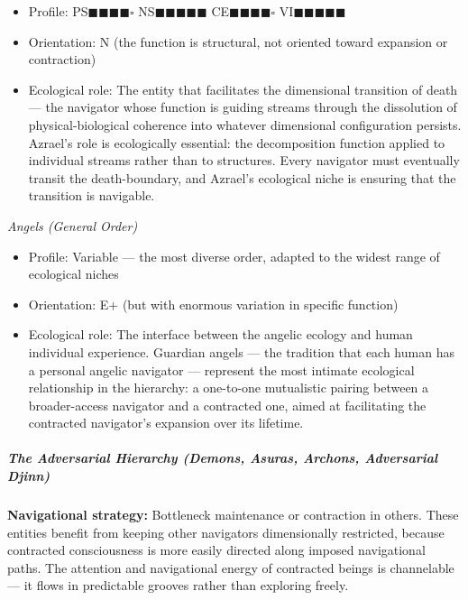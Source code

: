 \begin{itemize}[nosep,leftmargin=*]
  \item Profile: PS$\blacksquare$$\blacksquare$$\blacksquare$$\blacksquare$$\square$ NS$\blacksquare$$\blacksquare$$\blacksquare$$\blacksquare$$\blacksquare$ CE$\blacksquare$$\blacksquare$$\blacksquare$$\blacksquare$$\square$ VI$\blacksquare$$\blacksquare$$\blacksquare$$\blacksquare$$\blacksquare$
  \item Orientation: N (the function is structural, not oriented toward expansion or contraction)
  \item Ecological role: The entity that facilitates the dimensional transition of death — the navigator whose function is guiding streams through the dissolution of physical-biological coherence into whatever dimensional configuration persists. Azrael's role is ecologically essential: the decomposition function applied to individual streams rather than to structures. Every navigator must eventually transit the death-boundary, and Azrael's ecological niche is ensuring that the transition is navigable.
\end{itemize}


\textit{Angels (General Order)}

\begin{itemize}[nosep,leftmargin=*]
  \item Profile: Variable — the most diverse order, adapted to the widest range of ecological niches
  \item Orientation: E+ (but with enormous variation in specific function)
  \item Ecological role: The interface between the angelic ecology and human individual experience. Guardian angels — the tradition that each human has a personal angelic navigator — represent the most intimate ecological relationship in the hierarchy: a one-to-one mutualistic pairing between a broader-access navigator and a contracted one, aimed at facilitating the contracted navigator's expansion over its lifetime.
\end{itemize}


\subparagraph*{The Adversarial Hierarchy (Demons, Asuras, Archons, Adversarial Djinn)}


\textbf{Navigational strategy:} Bottleneck maintenance or contraction in others. These entities benefit from keeping other navigators dimensionally restricted, because contracted consciousness is more easily directed along imposed navigational paths. The attention and navigational energy of contracted beings is channelable — it flows in predictable grooves rather than exploring freely.


